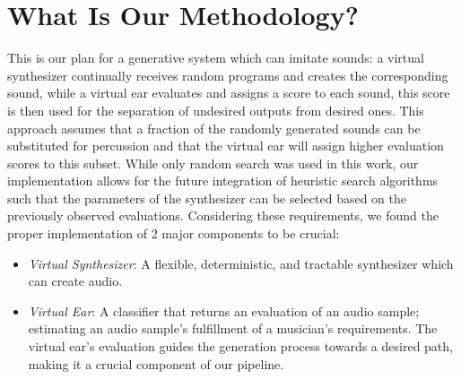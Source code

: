 \documentclass[\main/thesis.tex]{subfiles}
\begin{document}

\section{What Is Our Methodology?}
\label{sec_methodology}
This is our plan for a generative system which can imitate sounds: a virtual synthesizer continually receives random programs and creates the corresponding sound, while a virtual ear evaluates and assigns a score to each sound, this score is then used for the separation of undesired outputs from desired ones. This approach assumes that a fraction of the randomly generated sounds can be substituted for percussion and that the virtual ear will assign higher evaluation scores to this subset. While only random search was used in this work, our implementation allows for the future integration of heuristic search algorithms such that the parameters of the synthesizer can be selected based on the previously observed evaluations. Considering these requirements, we found the proper implementation of 2 major components to be crucial:

\begin{itemize}
    \item \textit{Virtual Synthesizer}: A flexible, deterministic, and tractable synthesizer which can create audio. 
    \item \textit{Virtual Ear}: A classifier that returns an evaluation of an audio sample; estimating an audio sample's fulfillment of a musician's requirements. The virtual ear's evaluation guides the generation process towards a desired path, making it a crucial component of our pipeline. 
\end{itemize}
\end{document}
